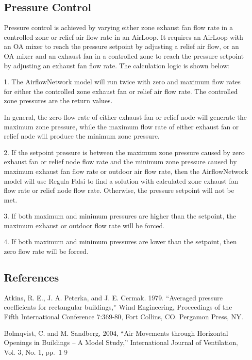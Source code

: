 \subsection{Pressure Control}\label{pressure-control}

Pressure control is achieved by varying either zone exhaust fan flow rate in a controlled zone or relief air flow rate in an AirLoop. It requires an AirLoop with an OA mixer to reach the pressure setpoint by adjusting a relief air flow, or an OA mixer and an exhaust fan in a controlled zone to reach the pressure setpoint by adjusting an exhaust fan flow rate. The calculation logic is shown below:

1. The AirflowNetwork model will run twice with zero and maximum flow rates for either the controlled zone exhaust fan or relief air flow rate. The controlled zone pressures are the return values.

	In general, the zero flow rate of either exhaust fan or relief node will generate the maximum zone pressure, while the maximum flow rate of either exhaust fan or relief node will produce the minimum zone pressure. 

2. If the setpoint pressure is between the maximum zone pressure caused by zero exhaust fan or relief node flow rate and the minimum zone pressure caused by maximum exhaust fan flow rate or outdoor air flow rate, then the AirflowNetwork model will use Regula Falsi to find a solution with calculated zone exhaust fan flow rate or relief node flow rate. Otherwise, the pressure setpoint will not be met. 

3. If both maximum and minimum pressures are higher than the setpoint, the maximum exhaust or outdoor flow rate will be forced. 

4. If both maximum and minimum pressures are lower than the setpoint, then zero flow rate will be forced.

\subsection{References}\label{references-004}

Atkins, R. E., J. A. Peterka, and J. E. Cermak. 1979. ``Averaged pressure coefficients for rectangular buildings,'' Wind Engineering, Proceedings of the Fifth International Conference 7:369-80, Fort Collins, CO. Pergamon Press, NY.

Bolmqvist, C. and M. Sandberg, 2004, ``Air Movements through Horizontal Openings in Buildings -- A Model Study,'' International Journal of Ventilation, Vol. 3, No. 1, pp.~1-9

